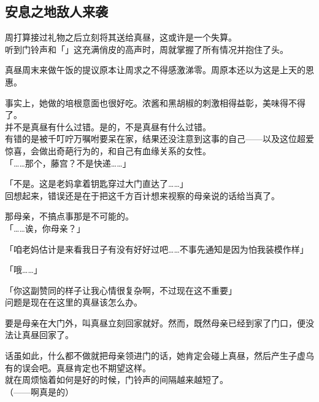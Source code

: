 \subsection{安息之地敌人来袭}

周打算接过礼物之后立刻将其送给真昼，这或许是一个失算。\\

听到门铃声和「」这充满俏皮的高声时，周就掌握了所有情况并抱住了头。\\

\vspace{2\baselineskip}

真昼周末来做午饭的提议原本让周求之不得感激涕零。周原本还以为这是上天的恩惠。

事实上，她做的培根意面也很好吃。浓酱和黑胡椒的刺激相得益彰，美味得不得了。\\

并不是真昼有什么过错。是的，不是真昼有什么过错。\\

有错的是被千叮咛万嘱咐要呆在家，结果还没注意到这事的自己——以及这位超爱惊喜，会做出奇葩行为的，和自己有血缘关系的女性。\\

「……那个，藤宫？不是快递……」

「不是。这是老妈拿着钥匙穿过大门直达了……」\\

回想起来，错误还是在于把这千方百计想来视察的母亲说的话给当真了。

那母亲，不搞点事那是不可能的。\\

「……诶，你母亲？」

「咱老妈估计是来看我日子有没有好好过吧……不事先通知是因为怕我装模作样」

「哦……」

「你这副赞同的样子让我心情很复杂啊，不过现在这不重要」\\

问题是现在在这里的真昼该怎么办。

要是母亲在大门外，叫真昼立刻回家就好。然而，既然母亲已经到家了门口，便没法让真昼回家了。

话虽如此，什么都不做就把母亲领进门的话，她肯定会碰上真昼，然后产生子虚乌有的误会吧。真昼肯定也不期望这样。\\

就在周烦恼着如何是好的时候，门铃声的间隔越来越短了。\\

（——啊真是的）

